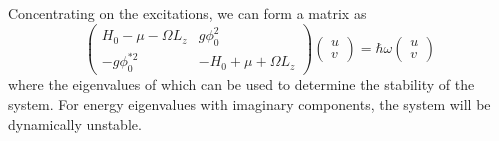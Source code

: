 Concentrating on the excitations, we can form a matrix as
\begin{equation}
    \begin{pmatrix}
        H_0 - \mu -\Omega L_z & g\phi_0^2 \\
        -g\phi_0^{*2} & -H_0 + \mu +\Omega L_z
    \end{pmatrix}
    \begin{pmatrix}
        u \\
        v
    \end{pmatrix}
    = \hbar\omega
    \begin{pmatrix}
        u \\
        v
    \end{pmatrix}
\end{equation}
where the eigenvalues of which can be used to determine the stability of the system. For energy eigenvalues with imaginary components, the system will be dynamically unstable.

\begin{equation}


\end{equation}
